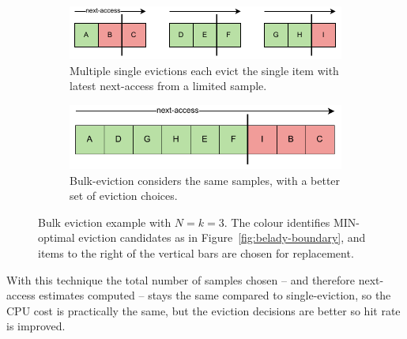 \begin{figure}
    \centering
    \begin{subfigure}{\columnwidth}
        \centering
        \includegraphics[width=\columnwidth]{figures/Diagrams/diagrams-multi-eviction-a.pdf}
        \caption{Multiple single evictions each evict the single item with latest next-access from a limited sample.}
    \end{subfigure}
    \vspace{5pt}
    \begin{subfigure}{\columnwidth}
        \centering
        \includegraphics[width=0.8181818\columnwidth]{figures/Diagrams/diagrams-multi-eviction-b.pdf}
        \caption{Bulk-eviction considers the same samples, with a better set of eviction choices.}
    \end{subfigure}
    
    \caption{Bulk eviction example with $N=k=3$. The colour identifies MIN-optimal eviction candidates as in Figure~\ref{fig:belady-boundary}, and items to the right of the vertical bars are chosen for replacement.}
    \label{fig:multi-eviction}
\end{figure}

With this technique the total number of samples chosen -- and therefore next-access estimates computed -- stays the same compared to single-eviction, so the CPU cost is practically the same, but the eviction decisions are better so hit rate is improved.





